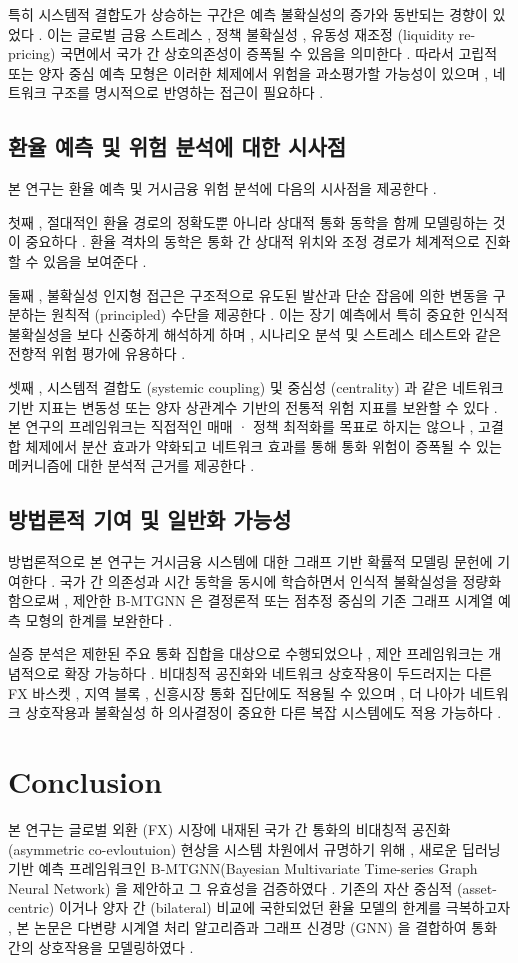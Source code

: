 \documentclass[10pt,a4paper]{article}
\begin{document}
특히 시스템적 결합도가 상승하는 구간은 예측 불확실성의 증가와 동반되는 경향이 있었다 . 이는 글로벌 금융 스트레스 , 정책 불확실성 , 유동성 재조정 (liquidity re-pricing) 국면에서 국가 간 상호의존성이 증폭될 수 있음을 의미한다 . 따라서 고립적 또는 양자 중심 예측 모형은 이러한 체제에서 위험을 과소평가할 가능성이 있으며 , 네트워크 구조를 명시적으로 반영하는 접근이 필요하다 .

\subsection{환율 예측 및 위험 분석에 대한 시사점}
본 연구는 환율 예측 및 거시금융 위험 분석에 다음의 시사점을 제공한다 .

첫째 , 절대적인 환율 경로의 정확도뿐 아니라 상대적 통화 동학을 함께 모델링하는 것이 중요하다 . 환율 격차의 동학은 통화 간 상대적 위치와 조정 경로가 체계적으로 진화할 수 있음을 보여준다 .

둘째 , 불확실성 인지형 접근은 구조적으로 유도된 발산과 단순 잡음에 의한 변동을 구분하는 원칙적 (principled) 수단을 제공한다 . 이는 장기 예측에서 특히 중요한 인식적 불확실성을 보다 신중하게 해석하게 하며 , 시나리오 분석 및 스트레스 테스트와 같은 전향적 위험 평가에 유용하다 .

셋째 , 시스템적 결합도 (systemic coupling) 및 중심성 (centrality) 과 같은 네트워크 기반 지표는 변동성 또는 양자 상관계수 기반의 전통적 위험 지표를 보완할 수 있다 . 본 연구의 프레임워크는 직접적인 매매 · 정책 최적화를 목표로 하지는 않으나 , 고결합 체제에서 분산 효과가 약화되고 네트워크 효과를 통해 통화 위험이 증폭될 수 있는 메커니즘에 대한 분석적 근거를 제공한다 .

\subsection{방법론적 기여 및 일반화 가능성}
방법론적으로 본 연구는 거시금융 시스템에 대한 그래프 기반 확률적 모델링 문헌에 기여한다 . 국가 간 의존성과 시간 동학을 동시에 학습하면서 인식적 불확실성을 정량화함으로써 , 제안한 B-MTGNN 은 결정론적 또는 점추정 중심의 기존 그래프 시계열 예측 모형의 한계를 보완한다 .

실증 분석은 제한된 주요 통화 집합을 대상으로 수행되었으나 , 제안 프레임워크는 개념적으로 확장 가능하다 . 비대칭적 공진화와 네트워크 상호작용이 두드러지는 다른 FX 바스켓 , 지역 블록 , 신흥시장 통화 집단에도 적용될 수 있으며 , 더 나아가 네트워크 상호작용과 불확실성 하 의사결정이 중요한 다른 복잡 시스템에도 적용 가능하다 .

\section{Conclusion}
본 연구는 글로벌 외환 (FX) 시장에 내재된 국가 간 통화의 비대칭적 공진화 (asymmetric co-evloutuion) 현상을 시스템 차원에서 규명하기 위해 , 새로운 딥러닝 기반 예측 프레임워크인 B-MTGNN(Bayesian Multivariate Time-series Graph Neural Network) 을 제안하고 그 유효성을 검증하였다 . 기존의 자산 중심적 (asset-centric) 이거나 양자 간 (bilateral) 비교에 국한되었던 환율 모델의 한계를 극복하고자 , 본 논문은 다변량 시계열 처리 알고리즘과 그래프 신경망 (GNN) 을 결합하여 통화 간의 상호작용을 모델링하였다 .
\end{document}
